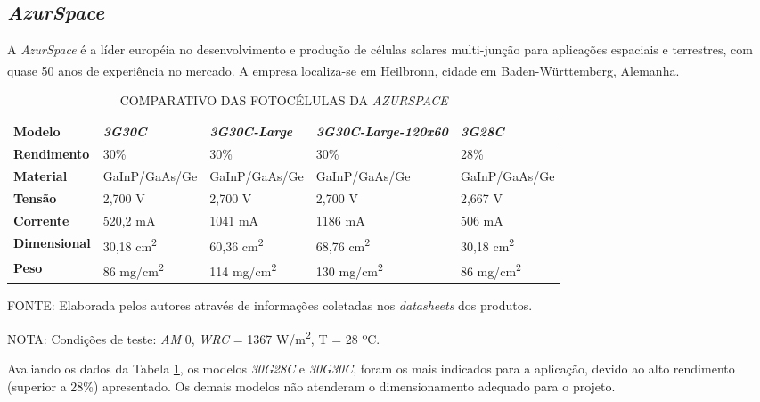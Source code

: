 \documentclass[
	12pt,				%
	openright,			%
	oneside,			%
	a4paper,			%
	english,			%
	french,				%
	spanish,			%
	brazil,				%
	oldfontcommands
	]{abntex2}
\begin{document}
\subsection[AzurSpace]{\textit{AzurSpace}}

	A \textit{AzurSpace} é a líder européia no desenvolvimento e produção de células solares multi-junção para aplicações espaciais e terrestres, com quase 50 anos de experiência no mercado. A empresa localiza-se em Heilbronn, cidade em Baden-Württemberg, Alemanha.\textsuperscript{\cite{AzurSpace}}
	
	\begin{table}[th]
	\caption{COMPARATIVO DAS FOTOCÉLULAS DA \textit{AZURSPACE}}
	\label{Tab_Azur_Comp}
	\begin{tabular}{p{2.5cm}|p{3.1cm}|p{3.1cm}|p{3.1cm}|p{3.1cm}}
		\textbf{Modelo} & \textit{\textbf{3G30C}} & \textit{\textbf{3G30C-Large}} & \textit{\textbf{3G30C-Large-120x60}} & \textit{\textbf{3G28C}} \\
		\hline
		\textbf{Rendimento} & 30\% & 30\% & 30\% & 28\% \\
		\hline
		\textbf{Material} & GaInP/GaAs/Ge & GaInP/GaAs/Ge & GaInP/GaAs/Ge & GaInP/GaAs/Ge\\
		\hline
		\textbf{Tensão} & 2,700 V & 2,700 V & 2,700 V & 2,667 V\\
		\hline
		\textbf{Corrente} & 520,2 mA & 1041 mA & 1186 mA & 506 mA\\
		\hline
		\textbf{Dimensional} & 30,18 cm\textsuperscript{2} & 60,36 cm\textsuperscript{2} & 68,76 cm\textsuperscript{2} & 30,18 cm\textsuperscript{2}\\
		\hline
		\textbf{Peso} & 86 mg/cm\textsuperscript{2} & 114 mg/cm\textsuperscript{2} & 130 mg/cm\textsuperscript{2} & 86 mg/cm\textsuperscript{2}\\
	\end{tabular}
	
	\begin{small}
	\vspace{3pt}
		FONTE: Elaborada pelos autores através de informações coletadas nos \textit{datasheets} dos produtos.
	\end{small}
	\begin{footnotesize}
		NOTA: Condições de teste: \textit{AM} 0, \textit{WRC} = 1367 W/m\textsuperscript{2}, T = 28 ºC.
	\end{footnotesize}
	\end{table}	
	
	Avaliando os dados da Tabela \ref{Tab_Azur_Comp}, os modelos \textit{30G28C} e \textit{30G30C}, foram os mais indicados para a aplicação, devido ao alto rendimento (superior a 28\%) apresentado. Os demais modelos não atenderam o dimensionamento adequado para o projeto.
	
\end{document}
